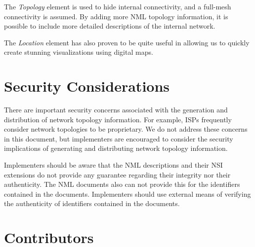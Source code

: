 \documentclass[12pt]{article}  %
\begin{document}
The \emph{Topology} element is used to hide internal connectivity, and 
a full-mesh connectivity is assumed. By adding more NML topology information, it is possible 
to include more detailed descriptions of the internal network.


The \emph{Location} element has also proven to be quite useful in allowing 
us to quickly create stunning visualizations using digital maps.


\section{Security Considerations} %
\label{sec:security_considerations}


There are important security concerns associated with the generation and distribution of network topology information. For example, ISPs frequently consider network topologies to be proprietary. We do not address these concerns in this document, but implementers are encouraged to consider the security implications of generating and distributing network topology information. 

Implementers should be aware that the NML descriptions and their NSI extensions do not provide any guarantee regarding their integrity nor their authenticity. The NML documents also can not provide this for the identifiers contained in the documents. Implementers should use external means of verifying the authenticity of identifiers contained in the documents.

\section{Contributors}

% 
% 
% 
\end{document}
